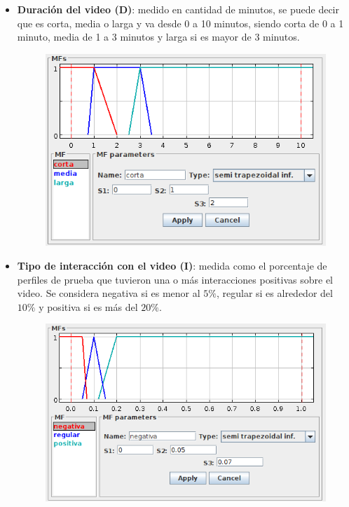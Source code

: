\documentclass{article}
\begin{document}
\begin{itemize}
\begin{figure}[H]
	\end{figure}
	\item \textbf{Duración del video (D)}: medido en cantidad de minutos, se puede decir que es corta, media o larga y va desde 0 a 10 minutos, siendo corta de 0 a 1 minuto, media de 1 a 3 minutos y larga si es mayor de 3 minutos.
	\begin{figure}[H]
		\centering
		\includegraphics[scale=0.6]{./Images/duracion_video.png}
	\end{figure}
	\item \textbf{Tipo de interacción con el video (I)}: medida como el porcentaje de perfiles de prueba que tuvieron una o más interacciones positivas sobre el video. Se considera negativa si es menor al $5\%$, regular si es alrededor del $10\%$ y positiva si es más del $20\%$.
	\begin{figure}[H]
		\centering
		\includegraphics[scale=0.55]{./Images/tipo_interaccion.png}

\end{figure}
\end{itemize}
\end{document}
